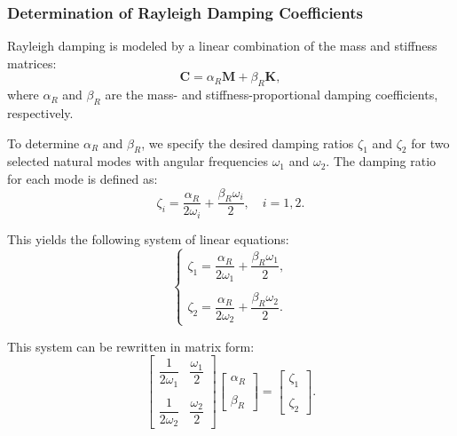 \documentclass{article}
\begin{document}
	\subsubsection{Determination of Rayleigh Damping Coefficients}
	
	Rayleigh damping is modeled by a linear combination of the mass and stiffness matrices:
	\begin{equation}
		\mathbf{C} = \alpha_R \mathbf{M} + \beta_R \mathbf{K},
	\end{equation}
	where \( \alpha_R \) and \( \beta_R \) are the mass- and stiffness-proportional damping coefficients, respectively.
	
	To determine \( \alpha_R \) and \( \beta_R \), we specify the desired damping ratios \( \zeta_1 \) and \( \zeta_2 \) for two selected natural modes with angular frequencies \( \omega_1 \) and \( \omega_2 \). The damping ratio for each mode is defined as:
	\begin{equation}
		\zeta_i = \frac{\alpha_R}{2\omega_i} + \frac{\beta_R \omega_i}{2}, \quad i = 1, 2.
	\end{equation}
	
	This yields the following system of linear equations:
	\[
	\begin{cases}
		\zeta_1 = \dfrac{\alpha_R}{2\omega_1} + \dfrac{\beta_R \omega_1}{2}, \\\\
		\zeta_2 = \dfrac{\alpha_R}{2\omega_2} + \dfrac{\beta_R \omega_2}{2}.
	\end{cases}
	\]
	
	This system can be rewritten in matrix form:
	\begin{equation}
		\begin{bmatrix}
			\dfrac{1}{2\omega_1} & \dfrac{\omega_1}{2} \\\\
			\dfrac{1}{2\omega_2} & \dfrac{\omega_2}{2}
		\end{bmatrix}
		\begin{bmatrix}
			\alpha_R \\\\
			\beta_R
		\end{bmatrix}
		=
		\begin{bmatrix}
			\zeta_1 \\\\
			\zeta_2
		\end{bmatrix}.
	\end{equation}
	
\end{document}
